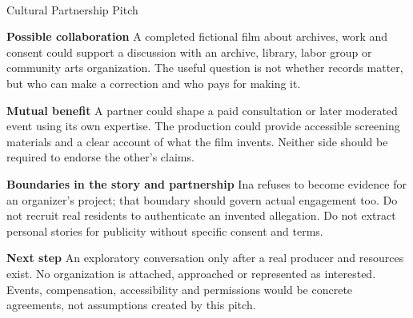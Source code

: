 \documentclass[11pt,letterpaper]{article}
\begin{document}
\begin{center}
{\Large\bfseries\sffamily \filmtitleupper}\\[6pt]
Cultural Partnership Pitch
\end{center}
\textbf{Possible collaboration} A completed fictional film about archives, work and consent could support a discussion with an archive, library, labor group or community arts organization. The useful question is not whether records matter, but who can make a correction and who pays for making it.

\textbf{Mutual benefit} A partner could shape a paid consultation or later moderated event using its own expertise. The production could provide accessible screening materials and a clear account of what the film invents. Neither side should be required to endorse the other's claims.

\textbf{Boundaries in the story and partnership} Ina refuses to become evidence for an organizer's project; that boundary should govern actual engagement too. Do not recruit real residents to authenticate an invented allegation. Do not extract personal stories for publicity without specific consent and terms.

\textbf{Next step} An exploratory conversation only after a real producer and resources exist. No organization is attached, approached or represented as interested. Events, compensation, accessibility and permissions would be concrete agreements, not assumptions created by this pitch.
\end{document}
